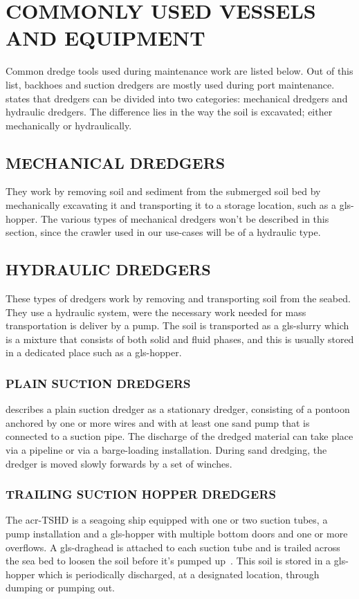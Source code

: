 \section{COMMONLY USED VESSELS AND EQUIPMENT}\label{sec:Commonly used vessels and equipment}
Common dredge tools used during maintenance work are listed below. Out of this list, backhoes and suction dredgers are
mostly used during port maintenance. \citet{vlasblom_designing_nodate} states that dredgers can be divided into two
categories: mechanical dredgers and hydraulic dredgers. The difference lies in the way the soil is excavated; either
mechanically or hydraulically.

\subsection{MECHANICAL DREDGERS}\label{sec:Mechanical Dredgers}
They work by removing soil and sediment from the submerged soil bed by mechanically excavating it and transporting it to
a storage location, such as a \gls{gls-hopper}. The various types of mechanical dredgers won't be described in this
section, since the crawler used in our use-cases will be of a hydraulic type.

\subsection{HYDRAULIC DREDGERS}
These types of dredgers work by removing and transporting soil from the seabed. They use a hydraulic system, were the
necessary work needed for mass transportation is deliver by a pump. The soil is transported as a \gls{gls-slurry} which
is a mixture that consists of both solid and fluid phases, and this is usually stored in a dedicated place such as a
\gls{gls-hopper}.

\subsubsection{PLAIN SUCTION DREDGERS}
\citet{vlasblom_designing_nodate} describes a plain suction dredger as a stationary dredger, consisting of a pontoon
anchored by one or more wires and with at least one sand pump that is connected to a suction pipe. The discharge of the
dredged material can take place via a pipeline or via a barge-loading installation. During sand dredging, the dredger is
moved slowly forwards by a set of winches.

\subsubsection{TRAILING SUCTION HOPPER DREDGERS}
The \gls{acr-TSHD} is a seagoing ship equipped with one or two suction tubes, a pump installation and a
\gls{gls-hopper} with multiple bottom doors and one or more overflows. A \gls{gls-draghead} is attached to each suction
tube and is trailed across the sea bed to loosen the soil before it's pumped up~\cite{van_der_schrieck_dredging_2014}.
This soil is stored in a \gls{gls-hopper} which is periodically discharged, at a designated location, through dumping
or pumping out.

